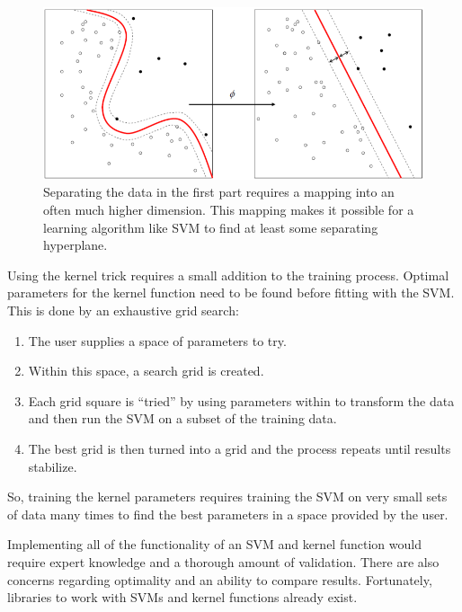 \documentclass[11pt]{article} %
\begin{document}
\begin{figure}[h]
  \centering
  \includegraphics[scale=.6]{images/kernel-machine.png}
  \caption{Separating the data in the first part requires a mapping into an
      often much higher dimension. This mapping makes it possible for a learning 
      algorithm like SVM to find at least some separating hyperplane.}
  \label{fig:kernel-machine}
\end{figure}

Using the kernel trick requires a small addition to the training process. Optimal
parameters for the kernel function need to be found before fitting with the SVM.
This is done by an exhaustive grid search:
\begin{enumerate}
    \item The user supplies a space of parameters to try.
    \item Within this space, a search grid is created.
    \item Each grid square is ``tried'' by using parameters within to transform
        the data and then run the SVM on a subset of the training data.
    \item The best grid is then turned into a grid and the process 
        repeats until results stabilize.
\end{enumerate}

So, training the kernel parameters requires training the SVM on very small sets
of data many times to find the best parameters in a space provided by the user.

Implementing all of the functionality of an SVM and kernel function would require
expert knowledge and a thorough amount of validation. There are also concerns 
regarding optimality and an ability to compare results. Fortunately, libraries to 
work with SVMs and kernel functions already exist.
\end{document}
